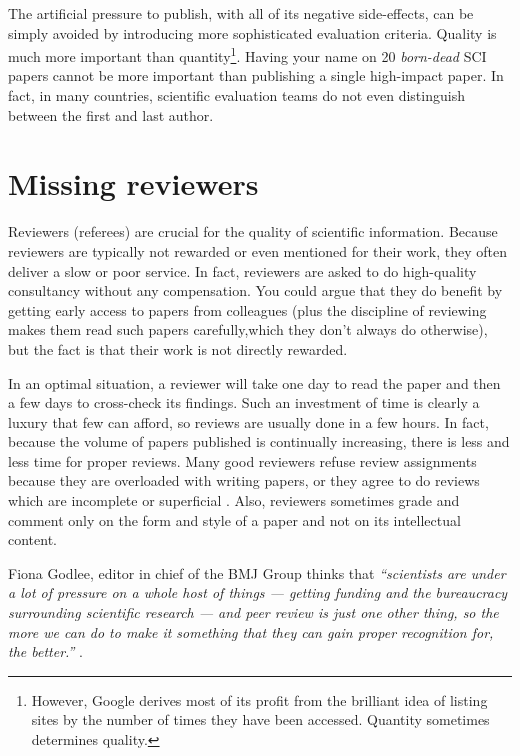 \documentclass[graybox,envcountchap,sectrefs,UStrade]{svmono}
\begin{document}
The artificial pressure to publish, with all of its negative side-effects, can be simply avoided by introducing more sophisticated evaluation criteria. Quality is much more important than quantity\footnote{However, Google derives most of its profit from the brilliant idea of listing sites by the number of times they have been accessed. Quantity sometimes determines quality.}. Having your name on 20 \emph{born-dead} SCI papers cannot be more important than publishing a single high-impact paper. In fact, in many countries, scientific evaluation teams do not even distinguish between the first and last author.\par


 \section{Missing reviewers}\label{sec:missingreviewers}

Reviewers (referees) are crucial for the quality of scientific information. Because reviewers are typically not rewarded or even mentioned for their work, they often deliver a slow or poor service. In fact, reviewers are asked to do high-quality consultancy without any compensation. You could argue that they do benefit by getting early access to papers from colleagues (plus the discipline of reviewing makes them read such papers carefully,which they don't always do otherwise), but the fact is that their work is not directly rewarded.\par

In an optimal situation, a reviewer will take one day to read the paper and then a few days to cross-check its findings. Such an investment of time is clearly a luxury that few can afford, so reviews are usually done in a few hours. In fact, because the volume of papers published is continually increasing, there is less and less time for proper reviews. Many good reviewers refuse review assignments because they are overloaded with writing papers, or they agree to do reviews which are incomplete or superficial \citep{Newmark2003Nature,Moore2005CSAN}. Also, reviewers sometimes grade and comment only on the form and style of a paper and not on its intellectual content. \par

Fiona Godlee, editor in chief of the BMJ Group thinks that \emph{``scientists are under a lot of pressure on a whole host of things --- getting funding and the bureaucracy surrounding scientific research --- and peer review is just one other thing, so the more we can do to make it something that they can gain proper recognition for, the better.''} \citep{ODowd2011}.\par
\end{document}
